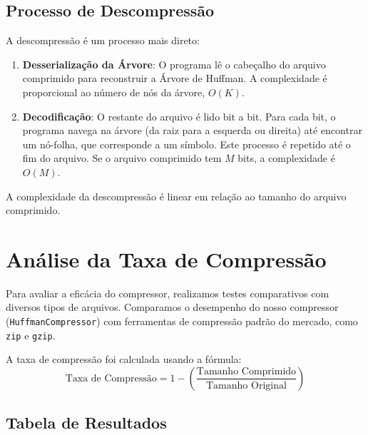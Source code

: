 \documentclass[12pt, a4paper]{article}
\begin{document}
\subsection{Processo de Descompressão}

A descompressão é um processo mais direto:
\begin{enumerate}
    \item \textbf{Desserialização da Árvore}: O programa lê o cabeçalho do arquivo comprimido para reconstruir a Árvore de Huffman. A complexidade é proporcional ao número de nós da árvore, \textbf{$O(K)$}.
    \item \textbf{Decodificação}: O restante do arquivo é lido bit a bit. Para cada bit, o programa navega na árvore (da raiz para a esquerda ou direita) até encontrar um nó-folha, que corresponde a um símbolo. Este processo é repetido até o fim do arquivo. Se o arquivo comprimido tem $M$ bits, a complexidade é \textbf{$O(M)$}.
\end{enumerate}
A complexidade da descompressão é linear em relação ao tamanho do arquivo comprimido.

\section{Análise da Taxa de Compressão}

Para avaliar a eficácia do compressor, realizamos testes comparativos com diversos tipos de arquivos. Comparamos o desempenho do nosso compressor (\texttt{HuffmanCompressor}) com ferramentas de compressão padrão do mercado, como \texttt{zip} e \texttt{gzip}.

A taxa de compressão foi calculada usando a fórmula:
\[ \text{Taxa de Compressão} = 1 - \left( \frac{\text{Tamanho Comprimido}}{\text{Tamanho Original}} \right) \]

\subsection{Tabela de Resultados}
\end{document}
